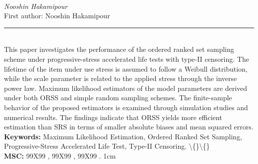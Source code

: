 \documentclass[10pt,twoside]{article}
\begin{document}
\noindent\begin{minipage}[t][\textheight]{\textwidth}
\\[0.35em]
{\itshape Nooshin Hakamipour}\\[0.2em]
{\footnotesize First author: Nooshin Hakamipour}\\[0.45em]
\noindent\rule{\textwidth}{0.3pt}\\[0.4em]
{\footnotesize  This paper investigates the performance of the ordered ranked set sampling scheme under progressive-stress accelerated life tests with type-II censoring. The lifetime of the item under use stress is assumed to follow a Weibull distribution, while the scale parameter is related to the applied stress through the inverse power law. Maximum likelihood estimators of the model parameters are derived under both ORSS and simple random sampling schemes. The finite-sample behavior of the proposed estimators is examined through simulation studies and numerical results. The findings indicate that ORSS yields more efficient estimation than SRS in terms of smaller absolute biases and mean squared errors.}\\[0.4em]
{\footnotesize\bfseries Keywords:} {\footnotesize Maximum Likelihood Estimation, Ordered Ranked Set Sampling, Progressive-Stress Accelerated Life Test, Type-II Censoring. \textbackslash\{\}\textbackslash\{\}}\\[0.15em]
{\footnotesize\bfseries MSC:} {\footnotesize 99X99 , 99X99 , 99X99 . 1cm}\\
\vfill
\end{minipage}
\newpage
\end{document}
